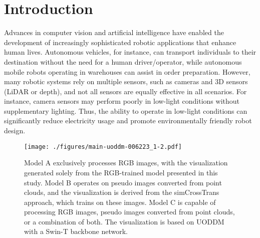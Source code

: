 \documentclass[]{modified_llncs}
\begin{document}
\section{Introduction}
\label{sec:intro}
Advances in computer vision and artificial intelligence have enabled the development of increasingly sophisticated robotic applications that enhance human lives. Autonomous vehicles, for instance, can transport individuals to their destination without the need for a human driver/operator, while autonomous mobile robots operating in warehouses can assist in order preparation. However, many robotic systems rely on multiple sensors, such as cameras and 3D sensors (LiDAR or depth), and not all sensors are equally effective in all scenarios. For instance, camera sensors may perform poorly in low-light conditions without supplementary lighting. Thus, the ability to operate in low-light conditions can significantly reduce electricity usage and promote environmentally friendly robot design.\\
\begin{figure}[t]
\begin{center}
\texttt{[image: ./figures/main-uoddm-006223\_1-2.pdf]}
\end{center}
    \caption{Model A exclusively processes RGB images, with the visualization generated solely from the RGB-trained model presented in this study. Model B operates on pseudo images converted from point clouds, and the visualization is derived from the simCrossTrans\cite{simCrossTrans_cite} approach, which trains on these images. Model C is capable of processing RGB images, pseudo images converted from point clouds, or a combination of both. The visualization is based on UODDM with a Swin-T \cite{liu2021Swin} backbone network.}
\label{fig:main}
\end{figure}
\end{document}
